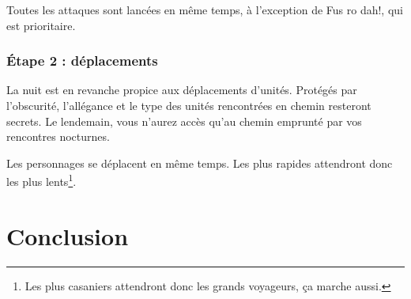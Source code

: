 Toutes les attaques sont lancées en même temps, à l'exception de Fus
ro dah!, qui est prioritaire.

\subsubsection{Étape 2 : déplacements}

La nuit est en revanche propice aux déplacements d'unités. Protégés par
l'obscurité, l'allégance et le type des unités rencontrées en chemin
resteront secrets. Le lendemain, vous n'aurez accès qu'au chemin
emprunté par vos rencontres nocturnes.

Les personnages se déplacent en même temps. Les plus rapides
attendront donc les plus lents\footnote{Les plus casaniers attendront
  donc les grands voyageurs, ça marche aussi.}.


\newpage
\section{Conclusion}

